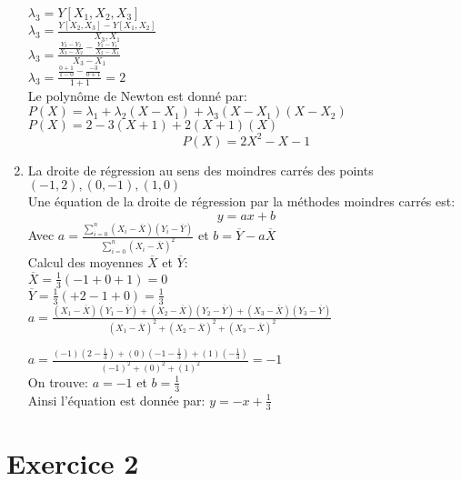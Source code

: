 \documentclass[17pt,a4paper]{article}
\begin{document}
\begin{enumerate}
$\lambda_{3}=Y[X_{1},X_{2},X_{3}]$\\

$\lambda_{3}=\frac{Y[X_{2},X_{3}]-Y[X_{1},X_{2}]}{X_{3},X_{1}}$\\
 
$\lambda_{3}=\frac{\frac{Y_{3}-Y_{2}}{X_{3}-X_{2}}-\frac{Y_{2}-Y_{1}}{X_{2}-X_{1}}}{X_{3}-X_{1}}$\\

$\lambda_{3}=\frac{\frac{0+1}{1-0}-\frac{-3}{0+1}}{1+1}=2$\\ 

Le polynôme de Newton est donné par: \\
$P(X)=\lambda_{1}+\lambda_{2}(X-X_{1})+\lambda_{3}(X-X_{1})(X-X_{2})$
$P(X)=2-3(X+1)+2(X+1)(X)$ \\ 
\[\boxed{P(X)=2X^{2}-X-1}\]
\item La droite de régression au sens des moindres carrés des points $(-1,2), (0,-1),(1,0)$\\

Une équation de la droite de régression par la méthodes moindres carrés est: \[y=ax+b\] Avec $a=\frac{\displaystyle\sum_{i=0}^n (X_{i}-\overline{X})(Y_{i}-\overline{Y})}{\displaystyle\sum_{i=0}^n (X_{i}-\overline{X})^{2}}$ et $b=\overline{Y}-a\overline{X}$\\

Calcul des moyennes $\overline{X}$ et $\overline{Y}$:\\

$\overline{X}=\frac{1}{3}(-1+0+1)=0$\\$\overline{Y}=\frac{1}{3}(+2-1+0)=\frac{1}{3}$\\

$a=\frac{(X_{1}-\overline{X})(Y_{1}-\overline{Y})+(X_{2}-\overline{X})(Y_{2}-\overline{Y})+(X_{3}-\overline{X})(Y_{3}-\overline{Y})}{(X_{1}-\overline{X})^{2}+(X_{2}-\overline{X})^{2}+(X_{3}-\overline{X})^{2}}$

$a=\frac{(-1)(2-\frac{1}{3})+(0)(-1-\frac{1}{3})+(1)(-\frac{1}{3})}{(-1)^{2}+(0)^{2}+(1)^{2}}=-1$ \\
On trouve:
$\boxed{a=-1}$ et $\boxed{b=\frac{1}{3}}$ \\ Ainsi l'équation est donnée par: $\boxed{y=-x+\frac{1}{3}}$

\end{enumerate}

\section{Exercice 2}
\end{document}
